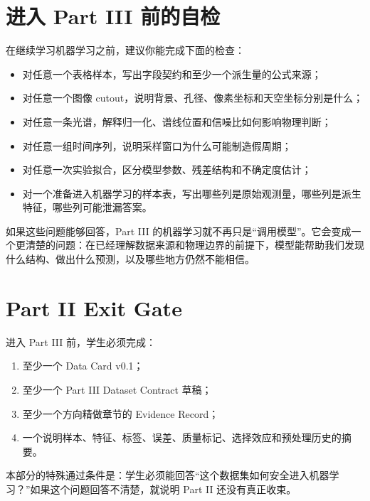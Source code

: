\section*{进入 Part III 前的自检}

在继续学习机器学习之前，建议你能完成下面的检查：

\begin{itemize}
    \item 对任意一个表格样本，写出字段契约和至少一个派生量的公式来源；
    \item 对任意一个图像 cutout，说明背景、孔径、像素坐标和天空坐标分别是什么；
    \item 对任意一条光谱，解释归一化、谱线位置和信噪比如何影响物理判断；
    \item 对任意一组时间序列，说明采样窗口为什么可能制造假周期；
    \item 对任意一次实验拟合，区分模型参数、残差结构和不确定度估计；
    \item 对一个准备进入机器学习的样本表，写出哪些列是原始观测量，哪些列是派生特征，哪些列可能泄漏答案。
\end{itemize}

如果这些问题能够回答，Part III 的机器学习就不再只是“调用模型”。它会变成一个更清楚的问题：在已经理解数据来源和物理边界的前提下，模型能帮助我们发现什么结构、做出什么预测，以及哪些地方仍然不能相信。

\section*{Part II Exit Gate}

进入 Part III 前，学生必须完成：

\begin{enumerate}
    \item 至少一个 Data Card v0.1；
    \item 至少一个 Part III Dataset Contract 草稿；
    \item 至少一个方向精做章节的 Evidence Record；
    \item 一个说明样本、特征、标签、误差、质量标记、选择效应和预处理历史的摘要。
\end{enumerate}

本部分的特殊通过条件是：学生必须能回答“这个数据集如何安全进入机器学习？”如果这个问题回答不清楚，就说明 Part II 还没有真正收束。
